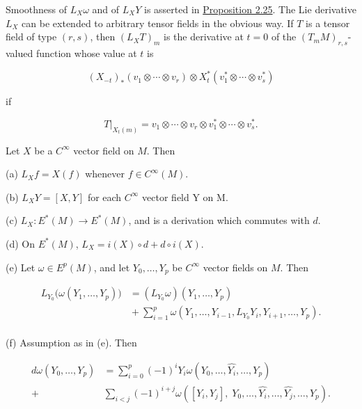 \begin{definition}
Smoothness of $L_{X}\omega$ and of $L_{X}Y$ is asserted in \hyperref[thm:2.25]{Proposition 2.25}. The Lie derivative $L_{X}$ can be extended to arbitrary tensor fields in the obvious way. If $T$ is a tensor field of type $(r,s)$, then $(L_{X}T)_{m}$ is the derivative at $t=0$ of the $(T_{m} M)_{r,s}$-valued function whose value at $t$ is

\[
(X_{-t})_{*}(v_{1}\otimes\cdots\otimes v_{r})\otimes X_{t}^{*}(v_{1}^{*}\otimes\cdots\otimes v_{s}^{*})
\]

if

\[
T\big|_{X_{t}(m)}=v_{1}\otimes\cdots\otimes v_{r}\otimes v_{1}^{*}\otimes\cdots\otimes v_{s}^{*}.
\]

\end{definition}

\begin{proposition}\label{thm:2.25}
Let $X$ be a $C^{\infty}$ vector field on $M$. Then

(a)  $ L_{X}f = X(f) $ whenever  $ f \in C^{\infty}(M) $.

(b)  $ L_{X}Y = [X,Y] $ for each  $ C^{\infty} $ vector field Y on M.

(c)  $ L_{X}\colon E^{*}(M)\to E^{*}(M) $, and is a derivation which commutes with  $ d $.

(d) On  $ E^{*}(M) $,  $ L_{X} = i(X) \circ d + d \circ i(X) $.

(e) Let $\omega \in E^{p}(M)$, and let $Y_{0}, \ldots, Y_{p}$ be $C^{\infty}$ vector fields on $M$. Then

\[
\begin{aligned}{L_{Y_{0}}\big(\omega(Y_{1},\ldots,Y_{p})\big)}&{{}=(L_{Y_{0}}\omega)(Y_{1},\ldots,Y_{p})}\\ {}&{{}+\sum_{i=1}^{p}\omega(Y_{1},\ldots,Y_{i-1},L_{Y_{0}}Y_{i},Y_{i+1},\ldots,Y_{p}).}\\ \end{aligned}
\]

(f) Assumption as in (e). Then

\[
\begin{aligned}{d\omega(Y_{0},\ldots,Y_{p})}&{{}=\sum_{i=0}^{p}(-1)^{i}Y_{i}\omega(Y_{0},\ldots,\widehat{Y_{i}},\ldots,Y_{p})}\\ {+}&{{}\sum_{i<j}(-1)^{i+j}\omega([Y_{i},Y_{j}],\;Y_{0},\ldots,\widehat{Y_{i}},\ldots,\widehat{Y_{j}},\ldots,Y_{p}).}\\ \end{aligned}
\]

\end{proposition}

